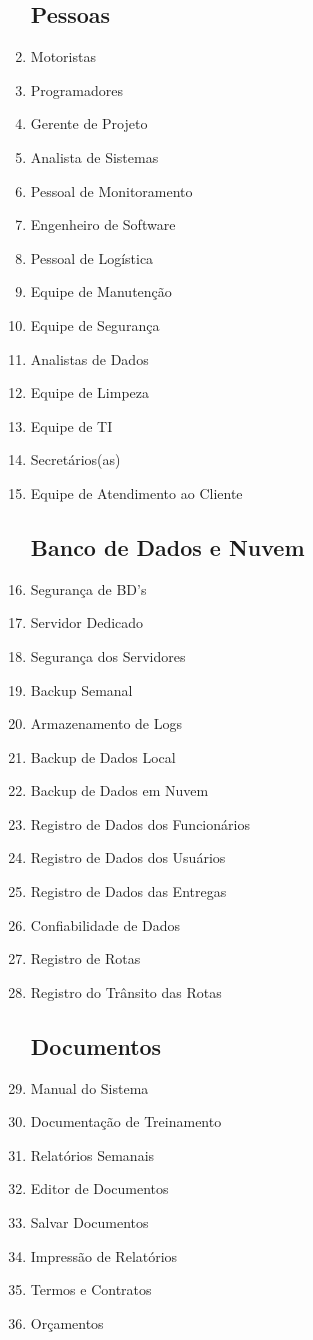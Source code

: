 \begin{enumerate}
	\subsection{Pessoas}
	\item Motoristas
	\item Programadores
	\item Gerente de Projeto
	\item Analista de Sistemas
	\item Pessoal de Monitoramento 
	\item Engenheiro de Software
	\item Pessoal de Logística
	\item Equipe de Manutenção
	\item Equipe de Segurança
	\item Analistas de Dados
	\item Equipe de Limpeza
	\item Equipe de TI
	\item Secretários(as)
	\item Equipe de Atendimento ao Cliente
	
	\subsection{Banco de Dados e Nuvem}
	\item Segurança de BD's
	\item Servidor Dedicado
	\item Segurança dos Servidores
	\item Backup Semanal
	\item Armazenamento de Logs
	\item Backup de Dados Local
	\item Backup de Dados em Nuvem
	\item Registro de Dados dos Funcionários
	\item Registro de Dados dos Usuários
	\item Registro de Dados das Entregas
	\item Confiabilidade de Dados
	\item Registro de Rotas
	\item Registro do Trânsito das Rotas
	
	\subsection{Documentos}
	\item Manual do Sistema
	\item Documentação de Treinamento 
	\item Relatórios Semanais
	\item Editor de Documentos
	\item Salvar Documentos
	\item Impressão de Relatórios
	\item Termos e Contratos
	\item Orçamentos
	

\end{enumerate}
